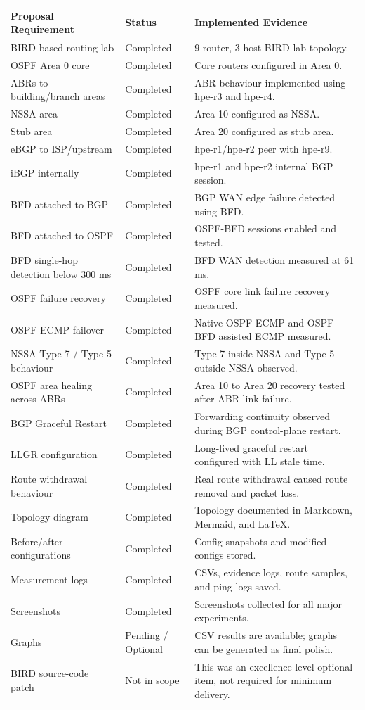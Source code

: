 \documentclass[12pt,a4paper]{article}
\begin{document}
\begin{longtable}{|p{5cm}|p{2.5cm}|p{7cm}|}
\hline
\textbf{Proposal Requirement} & \textbf{Status} & \textbf{Implemented Evidence} \\
\hline
BIRD-based routing lab & Completed & 9-router, 3-host BIRD lab topology. \\
\hline
OSPF Area 0 core & Completed & Core routers configured in Area 0. \\
\hline
ABRs to building/branch areas & Completed & ABR behaviour implemented using hpe-r3 and hpe-r4. \\
\hline
NSSA area & Completed & Area 10 configured as NSSA. \\
\hline
Stub area & Completed & Area 20 configured as stub area. \\
\hline
eBGP to ISP/upstream & Completed & hpe-r1/hpe-r2 peer with hpe-r9. \\
\hline
iBGP internally & Completed & hpe-r1 and hpe-r2 internal BGP session. \\
\hline
BFD attached to BGP & Completed & BGP WAN edge failure detected using BFD. \\
\hline
BFD attached to OSPF & Completed & OSPF-BFD sessions enabled and tested. \\
\hline
BFD single-hop detection below 300 ms & Completed & BFD WAN detection measured at 61 ms. \\
\hline
OSPF failure recovery & Completed & OSPF core link failure recovery measured. \\
\hline
OSPF ECMP failover & Completed & Native OSPF ECMP and OSPF-BFD assisted ECMP measured. \\
\hline
NSSA Type-7 / Type-5 behaviour & Completed & Type-7 inside NSSA and Type-5 outside NSSA observed. \\
\hline
OSPF area healing across ABRs & Completed & Area 10 to Area 20 recovery tested after ABR link failure. \\
\hline
BGP Graceful Restart & Completed & Forwarding continuity observed during BGP control-plane restart. \\
\hline
LLGR configuration & Completed & Long-lived graceful restart configured with LL stale time. \\
\hline
Route withdrawal behaviour & Completed & Real route withdrawal caused route removal and packet loss. \\
\hline
Topology diagram & Completed & Topology documented in Markdown, Mermaid, and LaTeX. \\
\hline
Before/after configurations & Completed & Config snapshots and modified configs stored. \\
\hline
Measurement logs & Completed & CSVs, evidence logs, route samples, and ping logs saved. \\
\hline
Screenshots & Completed & Screenshots collected for all major experiments. \\
\hline
Graphs & Pending / Optional & CSV results are available; graphs can be generated as final polish. \\
\hline
BIRD source-code patch & Not in scope & This was an excellence-level optional item, not required for minimum delivery. \\
\hline
\end{longtable}
\end{document}
